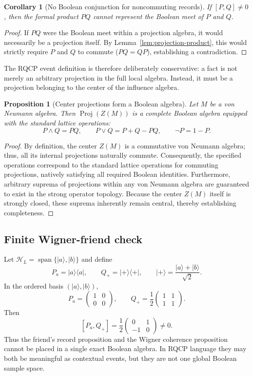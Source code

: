 \documentclass[11pt]{article}
\newtheorem{proposition}[theorem]{Proposition}
\newtheorem{corollary}[theorem]{Corollary}
\newcommand{\Hh}{\mathcal H}
\DeclareMathOperator{\Proj}{Proj}
\begin{document}
\begin{corollary}[No Boolean conjunction for noncommuting records]
If $[P,Q]\ne0$, then the formal product $PQ$ cannot represent the Boolean meet of $P$ and $Q$.
\end{corollary}

\begin{proof}
If $PQ$ were the Boolean meet within a projection algebra, it would necessarily be a projection itself. By Lemma~\ref{lem:projection-product}, this would strictly require $P$ and $Q$ to commute ($PQ=QP$), establishing a contradiction.
\end{proof}

The RQCP event definition is therefore deliberately conservative: a fact is not merely an arbitrary projection in the full local algebra. Instead, it must be a projection belonging to the center of the influence algebra.

\begin{proposition}[Center projections form a Boolean algebra]\label{prop:centerboolean}
Let $M$ be a von Neumann algebra. Then $\Proj(Z(M))$ is a complete Boolean algebra equipped with the standard lattice operations:
\[
P\wedge Q=PQ,\qquad P\vee Q=P+Q-PQ,\qquad \neg P=1-P.
\]
\end{proposition}

\begin{proof}
By definition, the center $Z(M)$ is a commutative von Neumann algebra; thus, all its internal projections naturally commute. Consequently, the specified operations correspond to the standard lattice operations for commuting projections, natively satisfying all required Boolean identities. Furthermore, arbitrary suprema of projections within any von Neumann algebra are guaranteed to exist in the strong operator topology. Because the center $Z(M)$ itself is strongly closed, these suprema inherently remain central, thereby establishing completeness.
\end{proof}

\subsection*{Finite Wigner-friend check}
Let $\Hh_L=\operatorname{span}\{|a\rangle,|b\rangle\}$ and define
\[
P_a=|a\rangle\langle a|,
\qquad
Q_+=|+\rangle\langle+|,
\qquad
|+\rangle=\frac{|a\rangle+|b\rangle}{\sqrt 2}.
\]
In the ordered basis $(|a\rangle,|b\rangle)$,
\[
P_a=\begin{pmatrix}1&0\\0&0\end{pmatrix},
\qquad
Q_+=\frac12\begin{pmatrix}1&1\\1&1\end{pmatrix}.
\]
Then
\[
[P_a,Q_+]=\frac12\begin{pmatrix}0&1\\-1&0\end{pmatrix}\ne0.
\]
Thus the friend's record proposition and the Wigner coherence proposition cannot be placed in a single exact Boolean algebra.  In RQCP language they may both be meaningful as contextual events, but they are not one global Boolean sample space.
\end{document}
